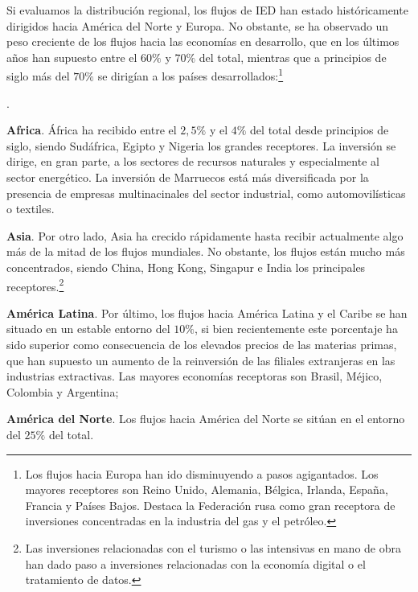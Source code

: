 \documentclass[10pt,a4paper]{article}
\newcounter{numitem}
\newenvironment{lnum}
      {\begin{list}{\arabic{numitem}.}{%
          \usecounter{numitem}%
          \setlength{\leftmargin}{1cm}%
          \setlength{\parskip}{3pt}%
          \setlength{\itemsep}{0pt}%
          \setlength{\parsep}{0pt}%
      }}
      {\end{list}}
\begin{document}
Si evaluamos la distribución regional, los flujos de IED han estado históricamente dirigidos hacia América del Norte y Europa. No obstante, se ha observado un peso creciente de los flujos hacia las economías en desarrollo, que en los últimos años han supuesto entre el $60\%$ y $70\%$ del total, mientras que a principios de siglo más del $70\%$ se dirigían a los países desarrollados:\footnote{%
    Los flujos hacia Europa han ido disminuyendo a pasos agigantados. Los mayores receptores son Reino Unido, Alemania, Bélgica, Irlanda, España, Francia y Países Bajos. Destaca la Federación rusa como gran receptora de inversiones concentradas en la industria del gas y el petróleo.
}
\begin{lnum}
    \item \textbf{Africa}. África ha recibido entre el $2,5\%$ y el $4\%$ del total desde principios de siglo, siendo Sudáfrica, Egipto y Nigeria los grandes receptores. La inversión se dirige, en gran parte, a los sectores de recursos naturales y especialmente al sector energético. La inversión de Marruecos está más diversificada por la presencia de empresas multinacinales del sector industrial, como automovilísticas o textiles. 
    \item \textbf{Asia}. Por otro lado, Asia ha crecido rápidamente hasta recibir actualmente algo más de la mitad de los flujos mundiales. No obstante, los flujos están mucho más concentrados, siendo China, Hong Kong, Singapur e India los principales receptores.\footnote{%
        Las inversiones relacionadas con el turismo o las intensivas en mano de obra han dado paso a inversiones relacionadas con la economía digital o el tratamiento de datos.
    }
    \item \textbf{América Latina}. Por último, los flujos hacia América Latina y el Caribe se han situado en un estable entorno del $10\%$, si bien recientemente este porcentaje ha sido superior como consecuencia de los elevados precios de las materias primas, que han supuesto un aumento de la reinversión de las filiales extranjeras en las industrias extractivas. Las mayores economías receptoras son Brasil, Méjico, Colombia y Argentina;
    \item \textbf{América del Norte}. Los flujos hacia América del Norte se sitúan en el entorno del $25\%$ del total. 
\end{lnum}
\end{document}
